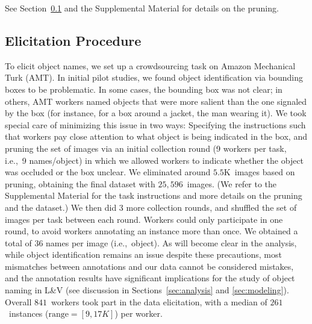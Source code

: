 See Section\ \ref{ssec:elicitation} and the Supplemental Material for details on the pruning. 

\subsection{Elicitation Procedure}
\label{ssec:elicitation}
To elicit object names, we set up a crowdsourcing task on Amazon Mechanical Turk (AMT).
In initial pilot studies, we found object identification via bounding boxes to be problematic.
In some cases, the bounding box was not clear; in others, AMT workers named objects that were more salient than the one signaled by the box (for instance, for a box around a jacket, the man wearing it).
We took special care of minimizing this issue in two ways: Specifying the instructions such that workers pay close attention to what object is being indicated in the box, and pruning the set of images via an initial collection round (9 workers per task, i.e.,\ 9 names/object) in which we allowed workers to indicate whether the object was occluded or the box unclear. 
We eliminated around $5.5$K\ images based on pruning, obtaining the final dataset with $25,596$\ images. 
(We refer to the Supplemental Material for the task instructions and more details on the pruning and the dataset.) 
We then did 3 more collection rounds, and shuffled the set of images per task between each round. 
Workers could only participate in one round, to avoid workers annotating an instance more than once. 
We obtained a total of 36 names per image (i.e.,\ object).
As will become clear in the analysis, while object identification remains an issue despite these precautions, most mismatches between \vg annotations  and our data cannot be considered mistakes, and the annotation results have significant implications for the study of object naming in L\&V (see discussion in Sections~\ref{sec:analysis} and \ref{sec:modeling}).
Overall $841$\ workers took part in the data elicitation, with a median of  $261$\ instances \mbox{($\textrm{range}=[9,17K]$)} per worker.


